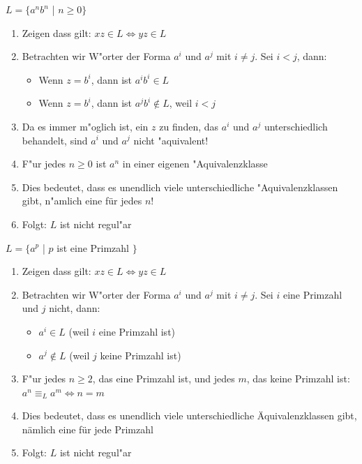 \documentclass[11pt, a4paper]{scrartcl}
\begin{document}
\newpage

$L = \{a^nb^n$ | $n \geq 0 \}$

\begin{enumerate}
    \item Zeigen dass gilt: $xz \in L \Leftrightarrow yz \in L$
    \item Betrachten wir W"orter der Forma $a^i$ und $a^j$ mit $i \neq j$. Sei $i < j$, dann:
    \begin{itemize}
        \item Wenn $z = b^i$, dann ist $a^ib^i \in L$
        \item Wenn $z = b^i$, dann ist $a^jb^i \notin L$, weil $i < j$
    \end{itemize}
    \item Da es immer m"oglich ist, ein $z$ zu finden, das $a^i$ und $a^j$ unterschiedlich behandelt, sind $a^i$ und $a^j$ nicht "aquivalent!
    \item F"ur jedes $n \geq 0$ ist $a^n$ in einer eigenen "Aquivalenzklasse
    \item Dies bedeutet, dass es unendlich viele unterschiedliche "Aquivalenzklassen gibt, n"amlich eine für jedes $n$!
    \item Folgt: $L$ ist nicht regul"ar
\end{enumerate}

\vspace{3em}

$L = \{a^p$ | $p$ ist eine Primzahl $\}$

\begin{enumerate}
    \item Zeigen dass gilt: $xz \in L \Leftrightarrow yz \in L$
    \item Betrachten wir W"orter der Forma $a^i$ und $a^j$ mit $i \neq j$. Sei $i$ eine Primzahl und $j$ nicht, dann:
    \begin{itemize}
        \item $a^i \in L$ (weil $i$ eine Primzahl ist)
        \item $a^j \notin L$ (weil $j$ keine Primzahl ist)
    \end{itemize}
    \item F"ur jedes $n \geq 2$, das eine Primzahl ist, und jedes $m$, das keine Primzahl ist:\\ $a^n \equiv_L a^m \Leftrightarrow n=m$
    \item Dies bedeutet, dass es unendlich viele unterschiedliche Äquivalenzklassen gibt, nämlich eine für jede Primzahl
    \item Folgt: $L$ ist nicht regul"ar
\end{enumerate}
\end{document}
